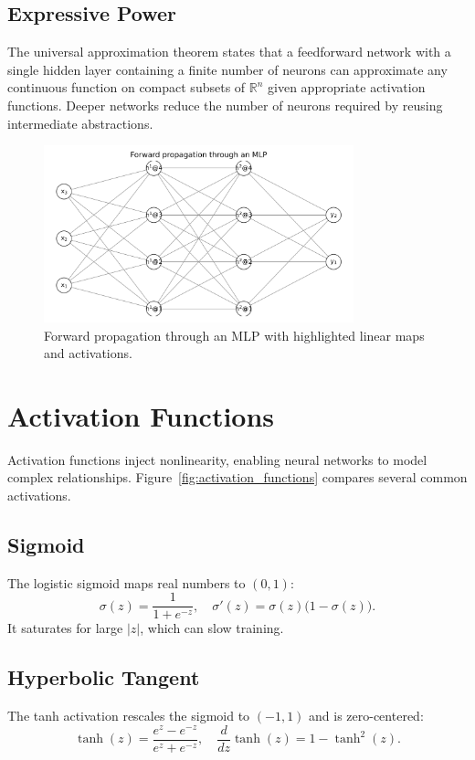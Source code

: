 ﻿\documentclass{article}
\begin{document}
\subsection{Expressive Power}
The universal approximation theorem states that a feedforward network with a single hidden layer containing a finite number of neurons can approximate any continuous function on compact subsets of $\mathbb{R}^n$ given appropriate activation functions. Deeper networks reduce the number of neurons required by reusing intermediate abstractions.

\begin{figure}[H]
  \centering
  \includegraphics[width=0.8\textwidth]{mlp_forward_pass.png}
  \caption{Forward propagation through an MLP with highlighted linear maps and activations.}
  \label{fig:mlp_forward_pass}
\end{figure}
\FloatBarrier

\section{Activation Functions}
Activation functions inject nonlinearity, enabling neural networks to model complex relationships. Figure~\ref{fig:activation_functions} compares several common activations.

\subsection{Sigmoid}
The logistic sigmoid maps real numbers to $(0,1)$:
\begin{equation}
  \sigma(z) = \frac{1}{1 + e^{-z}}, \quad \sigma'(z) = \sigma(z)\bigl(1-\sigma(z)\bigr).
\end{equation}
It saturates for large $|z|$, which can slow training.

\subsection{Hyperbolic Tangent}
The tanh activation rescales the sigmoid to $(-1,1)$ and is zero-centered:
\begin{equation}
  \tanh(z) = \frac{e^{z} - e^{-z}}{e^{z} + e^{-z}}, \quad \frac{d}{dz}\tanh(z) = 1 - \tanh^2(z).
\end{equation}
\end{document}
